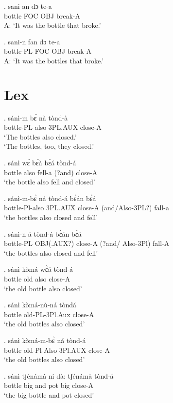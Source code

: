 \documentclass{assets/fieldnotes}
\begin{document}
\exg.
sani     an    dɔ    te-a    \\
bottle   FOC   OBJ   break-A \\%
A: `It was the bottle that broke.'

\exg.
sani-n      fan   dɔ    te-a    \\
bottle-PL   FOC   OBJ   break-A \\%
A: `It was the bottles that broke.'


\section{Lex}


\exg.
sánì-m      bɛ́     nà        tònd-à  \\
bottle-PL   also   3PL.AUX   close-A \\%
`The bottles also closed.' \label{The bottles also closed}\\
`The bottles, too, they closed.'

\exg. sánì wɛ́ bɛ́à bɛ̀á tònd-á\\
bottle also fell-a  (?and)   close-A \\
`the bottle also fell and closed'

\exg. sánì-m-bɛ̀ ná tònd-á bɛ̀án bɛ̀á\\
bottle-Pl-also 3PL.AUX close-A  (and/Also-3PL?) fall-a\\
`the bottles also closed and fell'

\exg. sánì-n á tònd-á bɛ̀án bɛ̀á\\
bottle-PL OBJ(.AUX?) close-A  (?and/ Also-3Pl) fall-A\\
`the bottles also closed and fell'

\exg. sánì kòmá wɛ̀á tònd-á\\
bottle old also close-A\\
`the old bottle also closed'

\exg. sánì kòmá-nù-ná tòndá\\
bottle old-PL-3Pl.Aux close-A\\
`the old bottles also closed'

\exg. sánì kòmá-m-bɛ̀  ná   tònd-á\\
    bottle old-Pl-Also 3Pl.AUX close-A\\
`the old bottles also closed'

\exg. sánì tʃénámà ni dà: tʃénámà tònd-á\\
bottle     big   and pot big    close-A\\
`the big bottle and pot  closed'
\end{document}
